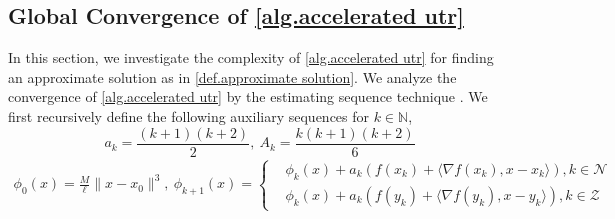 \documentclass{article}
\begin{document}
\subsection{Global Convergence of \autoref{alg.accelerated utr}}
In this section, we investigate the complexity of \autoref{alg.accelerated utr} for finding an approximate solution as in \autoref{def.approximate solution}. We analyze the convergence of \autoref{alg.accelerated utr} by the estimating sequence technique \cite{nesterov_lectures_2018}. We first recursively define the following auxiliary sequences for $k\in \mathbb{N}$,
\begin{equation}
    \label{eq.update a and A}
    a_k = \frac{(k+1)(k+2)}{2}, \ A_k=\frac{k(k+1)(k+2)}{6}
\end{equation}
\begin{align}\label{eq.update phi}
\phi_0(x) = \frac{M}{\ell}\|x-x_0\|^3, \ \phi_{k+1}(x) =\left\{ 
\begin{aligned}
&\phi_k(x)+a_k\left (f(x_k)+\langle \nabla f(x_k),x-x_k\rangle \right ), k\in \mathcal{N}\\
&\phi_k(x)+a_k\left (f(y_k)+\langle \nabla f(y_k),x-y_k\rangle \right ), k\in \mathcal{Z}
\end{aligned}
\right.
\end{align}
\end{document}
